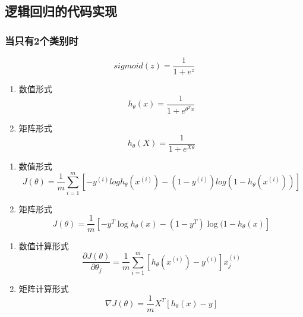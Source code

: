 \subsection{逻辑回归的代码实现}
\subsubsection{当只有2个类别时}

\begin{equation}
	sigmoid(z) = \frac{1}{1 + e^z}
\end{equation}


\begin{enumerate}
\item 数值形式
\begin{equation}
	h_\theta(x) = \frac{1}{1 + e^{\theta^T x}}
\end{equation}

\item 矩阵形式
\begin{equation}
	h_\theta(X) = \frac{1}{1 + e^{X \theta}}
\end{equation}
\end{enumerate}


\begin{enumerate}
\item 数值形式
\begin{equation}
	J(\theta) = \frac{1}{m}
	    \sum_{i=1}^m \left[ -y^{(i)}log{h_\theta(x^{(i)})} - (1-y^{(i)})log{(1-h_\theta(x^{(i)}))} \right]
\end{equation}

\item 矩阵形式
\begin{equation}
		J(\theta) = \frac{1}{m} \left[-y^T \log{h_\theta(x)} - (1-y^T) \log{(1-h_\theta(x)}\right]
\end{equation}
\end{enumerate}

\begin{enumerate}
\item 数值计算形式
\begin{equation}
	\frac{\partial J(\theta)}{\partial \theta_j} =
	    \frac{1}{m} \sum_{i=1}^m \left[h_\theta(x^{(i)}) - y^{(i)}\right] x_j^{(i)}
\end{equation}

\item 矩阵计算形式
\begin{equation}
	\nabla J(\theta) = \frac{1}{m} X^T \left[h_\theta(x) - y\right]
\end{equation}
\end{enumerate}


